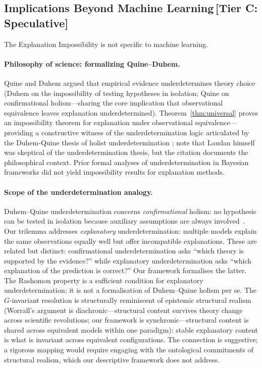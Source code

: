 \documentclass[11pt,a4paper]{article}
\begin{document}
\subsection{Implications Beyond Machine Learning\,\textnormal{\normalsize[Tier C: Speculative]}}
\label{sec:beyond-ml}

The Explanation Impossibility is not specific to machine learning.

\paragraph{Philosophy of science: formalizing Quine--Duhem.}
Quine \citep{quine1951dogmas} and Duhem \citep{duhem1906aim} argued that
empirical evidence underdetermines theory choice
(Duhem on the impossibility of testing hypotheses in isolation; Quine on
confirmational holism---sharing the core implication that observational
equivalence leaves explanation underdetermined).  Theorem~\ref{thm:universal}
proves an impossibility theorem for explanation under observational
equivalence---providing a constructive witness of the underdetermination logic
articulated by the Duhem-Quine thesis of holist underdetermination
\citep{laudan1991empirical}; note that Laudan himself was skeptical of the
underdetermination thesis, but the citation documents the philosophical context.
Prior formal analyses of underdetermination in Bayesian
frameworks \citep{dorling1979bayesian,howson2006scientific} did not yield
impossibility results for explanation methods.

\paragraph{Scope of the underdetermination analogy.}
Duhem--Quine underdetermination concerns \emph{confirmational} holism: no hypothesis can be tested in isolation because auxiliary assumptions are always involved~\cite{stanford2006exceeding}. Our trilemma addresses \emph{explanatory} underdetermination: multiple models explain the same observations equally well but offer incompatible explanations. These are related but distinct: confirmational underdetermination asks ``which theory is supported by the evidence?'' while explanatory underdetermination asks ``which explanation of the prediction is correct?'' Our framework formalises the latter. The Rashomon property is a sufficient condition for explanatory underdetermination; it is not a formalisation of Duhem--Quine holism per se. The $G$-invariant
resolution is structurally reminiscent of epistemic structural
realism \citep{worrall1989structural}
(Worrall's argument is diachronic---structural content survives theory change
across scientific revolutions; our framework is synchronic---structural content
is shared across equivalent models within one paradigm): stable explanatory
content is what is invariant across equivalent configurations. The connection
is suggestive; a rigorous mapping would require engaging with the ontological
commitments of structural realism, which our descriptive framework does not
address.
\end{document}
